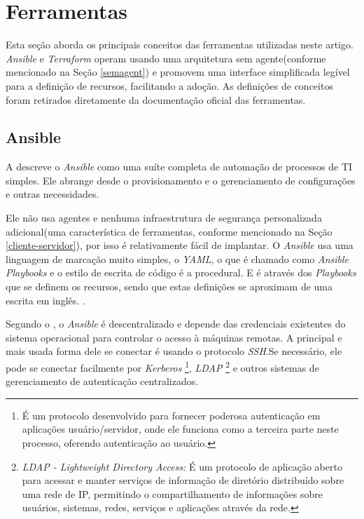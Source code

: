\section{Ferramentas}

Esta seção aborda os principais conceitos das ferramentas utilizadas neste artigo. \textit{Ansible} e \textit{Terraform} operam usando uma arquitetura sem agente(conforme mencionado na Seção \ref{semagent}) e promovem uma interface simplificada legível para a definição de recursos, facilitando a adoção. As definições de conceitos foram retirados diretamente da documentação oficial das ferramentas.

\subsection{Ansible} \label{Ansible}

A  descreve o \textit{Ansible} como uma suíte completa de automação de processos de TI simples. Ele abrange desde o provisionamento e o gerenciamento de configurações e outras necessidades.

Ele não usa agentes e nenhuma infraestrutura de segurança personalizada adicional(uma característica de ferramentas, conforme mencionado na Seção \ref{cliente-servidor}), por isso é relativamente fácil de implantar. O \textit{Ansible} usa uma linguagem de marcação muito simples, o \textit{YAML}, o que é chamado como \textit{Ansible Playbooks} e o estilo de escrita de código é a procedural. E é através dos \textit{Playbooks} que se definem os recursos, sendo que estas definições se aproximam de uma escrita em inglês. \cite{redhat}.

Segundo o , o \textit{Ansible} é descentralizado e depende das credenciais existentes do sistema operacional para controlar o acesso à máquinas remotas. A principal e mais usada forma dele se conectar é usando o protocolo \textit{SSH}.Se necessário, ele pode se conectar facilmente por \textit{Kerberos} \footnote{É um protocolo desenvolvido para fornecer poderosa autenticação em aplicações usuário/servidor, onde ele funciona como a terceira parte neste processo, oferendo autenticação ao usuário.}, \textit{LDAP} \footnote{\textit{LDAP - Lightweight Directory Access:} É um protocolo de aplicação aberto para acessar e manter serviços de informação de diretório distribuído sobre uma rede de IP, permitindo o compartilhamento de informações sobre usuários, sistemas, redes, serviços e aplicações através da rede.} e outros sistemas de gerenciamento de autenticação centralizados.


